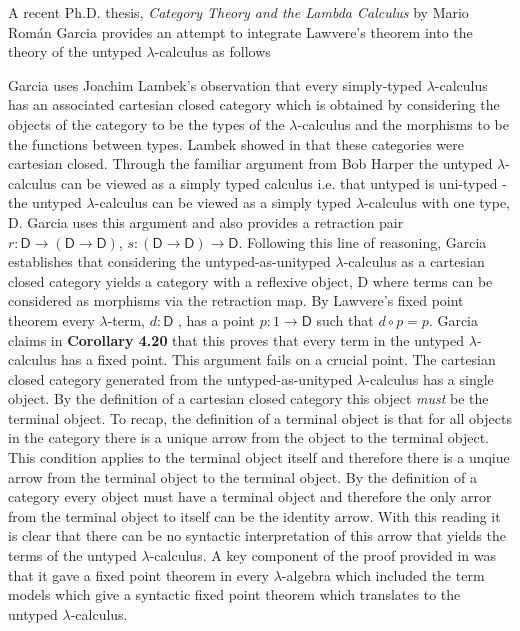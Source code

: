 A recent Ph.D. thesis, \textit{Category Theory and the Lambda Calculus} by Mario
Rom\'an Garcia provides an attempt to integrate Lawvere's theorem into the
theory of the untyped $\lambda$-calculus as follows

Garcia uses Joachim Lambek's observation that every simply-typed
$\lambda$-calculus has an associated cartesian closed category which is obtained
by considering the objects of the category to be the types of the
$\lambda$-calculus and the morphisms to be the functions between types. Lambek
showed in  that these categories were cartesian closed. Through the
familiar argument from  Bob Harper the untyped $\lambda$-calculus can
be viewed as a simply typed calculus i.e.  that untyped is uni-typed - the
untyped $\lambda$-calculus can be viewed as a simply typed $\lambda$-calculus
with one type, \textsf{D}. Garcia uses this argument and also provides a
retraction pair $r : \textsf{D} \rightarrow (\textsf{D} \rightarrow
\textsf{D})$, $s : (\textsf{D} \rightarrow \textsf{D}) \rightarrow \textsf{D}$.
Following this line of reasoning, Garcia establishes that considering the
untyped-as-unityped $\lambda$-calculus as a cartesian closed category yields a
category with a reflexive object, \textsf{D} where terms can be considered as
morphisms via the retraction map. By Lawvere's fixed point theorem every
$\lambda$-term, $d : \textsf{D}$ , has a point $p: 1 \rightarrow \textsf{D}$
such that $d \circ p = p$. Garcia claims in \textbf{Corollary 4.20} that this
proves that every term in the untyped $\lambda$-calculus has a fixed point. This
argument fails on a crucial point. The cartesian closed category generated from
the untyped-as-unityped $\lambda$-calculus has a single object. By the
definition of a cartesian closed category this object \textit{must} be the
terminal object. To recap, the definition of a terminal object is that for all
objects in the category there is a unique arrow from the object to the terminal
object. This condition applies to the terminal object itself and therefore there
is a unqiue arrow from the terminal object to the terminal object. By the
definition of a category every object must have a terminal object and therefore
the only arror from the terminal object to itself can be the identity arrow.
With this reading it is clear that there can be no syntactic interpretation of
this arrow that yields the terms of the untyped $\lambda$-calculus. A key
component of the proof provided in  was that it gave a fixed point
theorem in every $\lambda$-algebra which included the term models which give a
syntactic fixed point theorem which translates to the untyped
$\lambda$-calculus.

